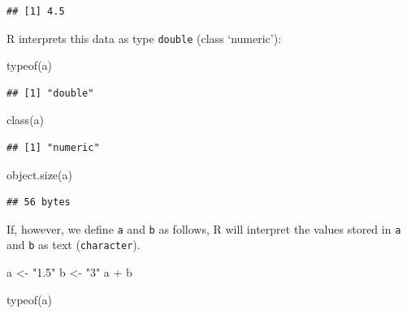 \documentclass[
  12pt,
]{style/krantz}
\newenvironment{Shaded}{\begin{snugshade}}{\end{snugshade}}
\newcommand{\FunctionTok}[1]{\textcolor[rgb]{0.00,0.00,0.00}{#1}}
\newcommand{\NormalTok}[1]{#1}
\newcommand{\OtherTok}[1]{\textcolor[rgb]{0.56,0.35,0.01}{#1}}
\newcommand{\SpecialCharTok}[1]{\textcolor[rgb]{0.00,0.00,0.00}{#1}}
\newcommand{\StringTok}[1]{\textcolor[rgb]{0.31,0.60,0.02}{#1}}
\begin{document}
\begin{verbatim}
## [1] 4.5
\end{verbatim}

R interprets this data as type \texttt{double} (class `numeric'):

\begin{Shaded}
\begin{Highlighting}[]
\FunctionTok{typeof}\NormalTok{(a)}
\end{Highlighting}
\end{Shaded}

\begin{verbatim}
## [1] "double"
\end{verbatim}

\begin{Shaded}
\begin{Highlighting}[]
\FunctionTok{class}\NormalTok{(a)}
\end{Highlighting}
\end{Shaded}

\begin{verbatim}
## [1] "numeric"
\end{verbatim}

\begin{Shaded}
\begin{Highlighting}[]
\FunctionTok{object.size}\NormalTok{(a)}
\end{Highlighting}
\end{Shaded}

\begin{verbatim}
## 56 bytes
\end{verbatim}

If, however, we define \texttt{a} and \texttt{b} as follows, R will interpret the values stored in \texttt{a} and \texttt{b} as text (\texttt{character}).

\begin{Shaded}
\begin{Highlighting}[]
\NormalTok{a }\OtherTok{\textless{}{-}} \StringTok{"1.5"}
\NormalTok{b }\OtherTok{\textless{}{-}} \StringTok{"3"}
\NormalTok{a }\SpecialCharTok{+}\NormalTok{ b}
\end{Highlighting}
\end{Shaded}

\begin{Shaded}
\begin{Highlighting}[]
\FunctionTok{typeof}\NormalTok{(a)}
\end{Highlighting}
\end{Shaded}
\end{document}
